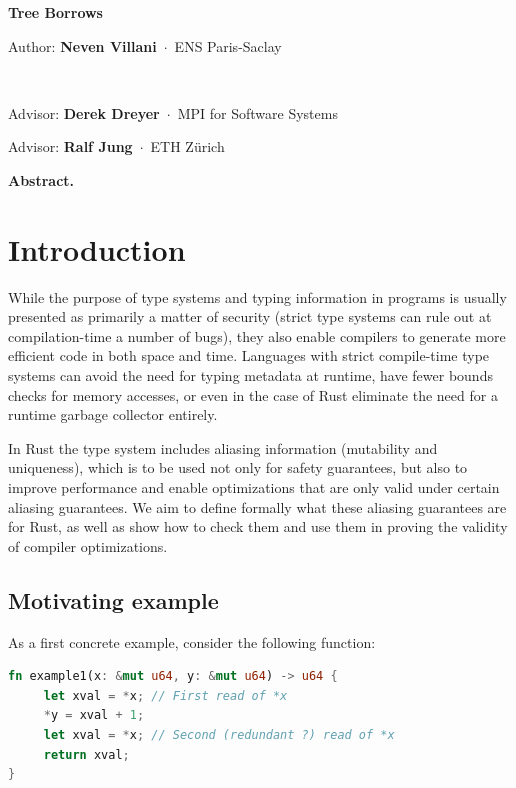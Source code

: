 \documentclass[a4paper,11pt]{article}
\newcommand{\myaff}[1]{\,$\cdot$\, {\small #1}\par\smallskip}
\newcommand{\fakeparagraph}[2]{\par\noindent\textbf{#1}\hspace{1em}#2}
\theoremstyle{plain}
\theoremstyle{definition}
\theoremstyle{remark}
\newenvironment{myabstract}
{\list{}{\listparindent 1.5em%
        \itemindent    \listparindent
        \leftmargin    0cm
        \rightmargin   0cm
        \parsep        0pt}%
    \item\relax}
{\endlist}
\newenvironment{mycover}
{\list{}{\listparindent 0pt
        \itemindent    \listparindent
        \leftmargin    0cm
        \rightmargin   0cm
        \parsep        0pt}%
    \raggedright
    \item\relax}
{\endlist}
\begin{document}
\begin{mycover}
{\huge\bfseries\boldmath Tree Borrows\par}
\bigskip
\bigskip
\bigskip


Author: \textbf{Neven Villani}
\myaff{ENS Paris-Saclay}

~\newline

Advisor: \textbf{Derek Dreyer}
\myaff{MPI for Software Systems}


Advisor: \textbf{Ralf Jung}
\myaff{ETH Zürich}


\end{mycover}
\medskip

\begin{myabstract}
\fakeparagraph{Abstract.}
\end{myabstract}
\medskip


\section{Introduction}

While the purpose of type systems and typing information in programs is usually
presented as primarily a matter of security (strict type systems can rule out
at compilation-time a number of bugs), they also enable compilers to generate
more efficient code in both space and time. Languages with strict compile-time
type systems can avoid the need for typing metadata at runtime, have fewer
bounds checks for memory accesses, or even in the case of Rust eliminate the
need for a runtime garbage collector entirely.

In Rust the type system includes aliasing information (mutability and uniqueness),
which is to be used not only for safety guarantees, but also to improve
performance and enable optimizations that are only valid under certain aliasing
guarantees.
We aim to define formally what these aliasing guarantees are for Rust, as
well as show how to check them and use them in proving the validity of compiler
optimizations.

\subsection{Motivating example}

As a first concrete example, consider the following function:
\begin{lstlisting}[language=rust]
fn example1(x: &mut u64, y: &mut u64) -> u64 {
     let xval = *x; // First read of *x
     *y = xval + 1;
     let xval = *x; // Second (redundant ?) read of *x
     return xval;
}
\end{lstlisting}
\end{document}
